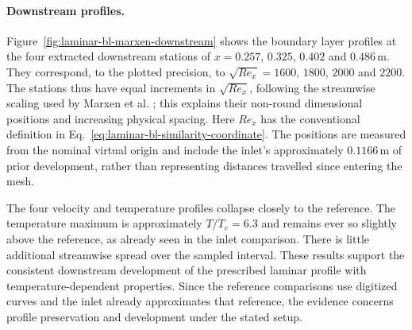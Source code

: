 \paragraph{Downstream profiles.}
Figure~\ref{fig:laminar-bl-marxen-downstream} shows the boundary layer profiles at the four extracted downstream stations of \(x=0.257\), \(0.325\), \(0.402\) and \(0.486\,\mathrm{m}\).
They correspond, to the plotted precision, to \(\sqrt{Re_x}=1600\), \(1800\), \(2000\) and \(2200\).
The stations thus have equal increments in \(\sqrt{Re_x}\), following
the streamwise scaling used by Marxen et al. \citep[Section II.B]{Marxen2011HighOrder}; this explains their non-round dimensional positions and increasing physical spacing. Here \(Re_x\)
has the conventional definition in Eq.~\eqref{eq:laminar-bl-similarity-coordinate}. The positions are measured from the nominal virtual origin and include the inlet's approximately
\(0.1166\,\mathrm{m}\) of prior development, rather than representing
distances travelled since entering the mesh.
\par\medskip

The four velocity and temperature profiles collapse closely to the reference.
The temperature maximum is approximately \(T/T_e=6.3\) and remains ever so slightly above the reference, as already seen in the inlet comparison. There is little additional streamwise spread
over the sampled interval. These results support the consistent downstream
development of the prescribed laminar profile with temperature-dependent
properties. Since the reference comparisons use digitized curves and the
inlet already approximates that reference, the evidence concerns profile
preservation and development under the stated setup.

